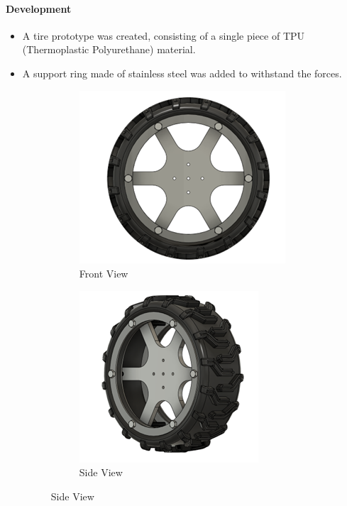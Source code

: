 \documentclass{article}
\begin{document}
\paragraph[short]{Development}
\begin{itemize}
    \item A tire prototype was created, consisting of a single piece of TPU (Thermoplastic Polyurethane) material.
    \item A support ring made of stainless steel was added to withstand the forces.
    \begin{figure}[H]
        \centering
        \begin{subfigure}{.5\textwidth}
          \centering
          \includegraphics[width=.8\linewidth]{Images/Wheels/FrontViewP1.png}
          \caption{Front View}
          
        \end{subfigure}%
        \begin{subfigure}{.5\textwidth}
          \centering
          \includegraphics[width=.8\linewidth]{Images/Wheels/SideViewP1.png}
          \caption{Side View}
          

\end{subfigure}
\end{figure}
\end{itemize}
\end{document}
